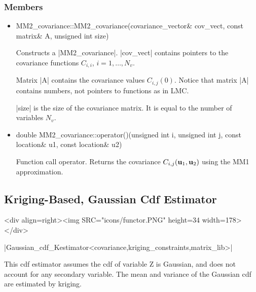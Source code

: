 \documentclass[12pt,twoside]{report}
\newcommand{\mloc}[1]{\rm{\bf #1}}
\begin{document}
\htmlrule[CLEAR=all]  \subsubsection*{Members}
\begin{itemize}

\item
 \begin{code} 
MM2_covariance::MM2_covariance(covariance_vector& cov_vect,
                               const matrix& A, unsigned int size)
\end{code}

Constructs a |MM2_covariance|. |cov_vect| contains pointers to the covariance functions $C_{i,i}$, $i=1,\ldots,N_v$.

 Matrix |A| contains the covariance values $C_{i,j}(0)$. Notice that matrix |A| contains numbers, not pointers to functions as in LMC.

|size| is the size of the covariance matrix. It is equal to the number of variables $N_v$.


\item
 \begin{code} 
double MM2_covariance::operator()(unsigned int i, unsigned int j,
                                  const location& u1, const location& u2)
  \end{code}

Function call operator. Returns the covariance $C_{i,j}(\mloc{u}_1,\mloc{u}_2)$ using the MM1 approximation.
\end{itemize}










\subsection{Kriging-Based, Gaussian Cdf Estimator}
\begin{htmlonly}
<div align=right><img SRC="icons/functor.PNG" height=34 width=178></div>
\end{htmlonly}

|Gaussian_cdf_Kestimator<covariance,kriging_constraints,matrix_lib>|
\vspace{0.3cm}


This cdf estimator assumes the cdf of variable Z is Gaussian, and does not account for any secondary variable. The mean and variance of the Gaussian cdf are estimated by kriging.
\end{document}
